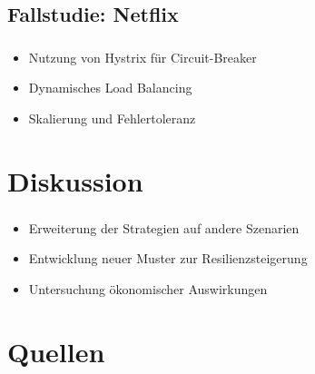 \subsection{Fallstudie: Netflix}
\begin{frame}
    \frametitle{\insertsection}
    \framesubtitle{\insertsubsection}

    \begin{itemize}
        \item Nutzung von Hystrix für Circuit-Breaker
        \item Dynamisches Load Balancing
        \item Skalierung und Fehlertoleranz
    \end{itemize}
\end{frame}

%
%

\section{Diskussion}

\begin{frame}
    \frametitle{\insertsection}
    \framesubtitle{\insertsubsection}

    \begin{itemize}
        \item Erweiterung der Strategien auf andere Szenarien
        \item Entwicklung neuer Muster zur Resilienzsteigerung
        \item Untersuchung ökonomischer Auswirkungen
    \end{itemize}
\end{frame}

\section{Quellen}
\begin{frame}[allowframebreaks]{\insertsection} %

\end{frame}

